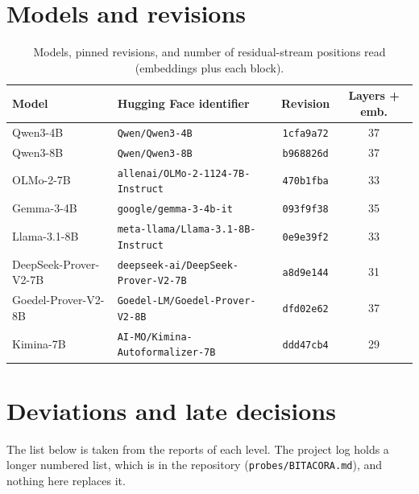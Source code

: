\documentclass[10pt]{article}
\newcommand{\vr}[1]{\texttt{#1}}
\begin{document}



\appendix
\section{Models and revisions}\label{app:modelos}
\begin{table}[h]
\centering
\caption{Models, pinned revisions, and number of residual-stream positions read (embeddings plus each block).}
\vspace{2pt}
\begin{tabular}{@{}llcc@{}}
\toprule
Model & Hugging Face identifier & Revision & Layers + emb.\\
\midrule
Qwen3-4B              & \vr{Qwen/Qwen3-4B}                         & \vr{1cfa9a72} & 37\\
Qwen3-8B              & \vr{Qwen/Qwen3-8B}                         & \vr{b968826d} & 37\\
OLMo-2-7B             & \vr{allenai/OLMo-2-1124-7B-Instruct}       & \vr{470b1fba} & 33\\
Gemma-3-4B            & \vr{google/gemma-3-4b-it}                  & \vr{093f9f38} & 35\\
Llama-3.1-8B          & \vr{meta-llama/Llama-3.1-8B-Instruct}      & \vr{0e9e39f2} & 33\\
DeepSeek-Prover-V2-7B & \vr{deepseek-ai/DeepSeek-Prover-V2-7B}     & \vr{a8d9e144} & 31\\
Goedel-Prover-V2-8B   & \vr{Goedel-LM/Goedel-Prover-V2-8B}         & \vr{dfd02e62} & 37\\
Kimina-7B             & \vr{AI-MO/Kimina-Autoformalizer-7B}        & \vr{ddd47cb4} & 29\\
\bottomrule
\end{tabular}
\end{table}

\section{Deviations and late decisions}\label{app:desviaciones}

The list below is taken from the reports of each level. The project log holds a longer numbered list, which is in the repository (\vr{probes/BITACORA.md}), and nothing here replaces it.
\end{document}

